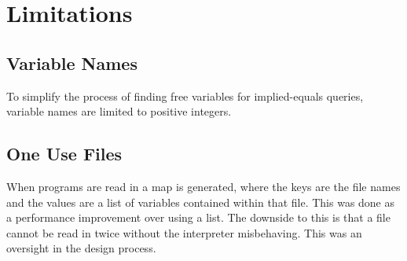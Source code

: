 \section{Limitations}
    \subsection{Variable Names}
        To simplify the process of finding free variables for implied-equals queries, variable names are limited to positive integers.
    \subsection{One Use Files}
        When programs are read in a map is generated, where the keys are the file names and the values are a list of variables contained within that file. This was done as a performance improvement over using a list. The downside to this is that a file cannot be read in twice without the interpreter misbehaving. This was an oversight in the design process.